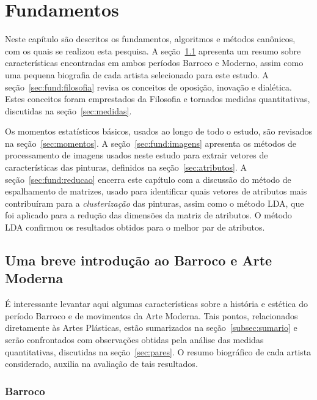 
\afterpage{\blankpage}
\chapter{Fundamentos}
\label{cap:fundamentos}

Neste capítulo são descritos os fundamentos, algoritmos e métodos
canônicos, com os quais se realizou esta pesquisa. A
seção~\ref{sec:breve} apresenta um resumo sobre características
encontradas em ambos períodos Barroco e Moderno, assim como uma
pequena biografia de cada artista selecionado para este estudo. A
seção~\ref{sec:fund:filosofia} revisa os conceitos de oposição,
inovação e dialética. Estes conceitos foram emprestados da Filosofia e
tornados medidas quantitativas, discutidas na seção~\ref{sec:medidas}.

Os momentos estatísticos básicos, usados ao longo de todo o estudo,
são revisados na seção~\ref{sec:momentos}. A
seção~\ref{sec:fund:imagens} apresenta os métodos de processamento de
imagens usados neste estudo para extrair vetores de características
das pinturas, definidos na seção~\ref{sec:atributos}. A
seção~\ref{sec:fund:reducao} encerra este capítulo com a discussão do
método de espalhamento de matrizes, usado para identificar quais
vetores de atributos mais contribuíram para a \textit{clusterização}
das pinturas, assim como o método LDA, que foi aplicado para a redução
das dimensões da matriz de atributos. O método LDA confirmou os
resultados obtidos para o melhor par de atributos.

\section{Uma breve introdução ao Barroco e Arte Moderna}
\label{sec:breve}

É interessante levantar aqui algumas características sobre a história
e estética do período Barroco e de movimentos da Arte Moderna. Tais
pontos, relacionados diretamente às Artes Plásticas, estão sumarizados
na seção~\ref{subsec:sumario} e serão confrontados com observações
obtidas pela análise das medidas quantitativas, discutidas na
seção~\ref{sec:pares}. O resumo biográfico de cada artista
considerado, auxilia na avaliação de tais resultados.

\subsection{Barroco}


